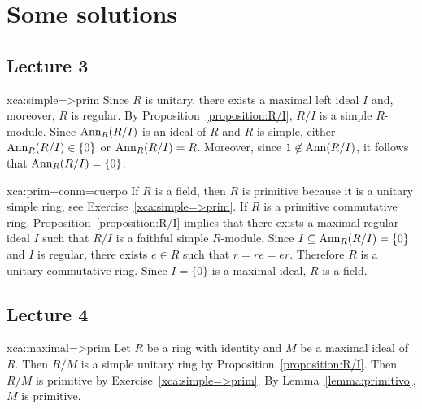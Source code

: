 \chapter*{Some solutions}

\section*{Lecture 3}

\begin{sol}{xca:simple=>prim}
	Since $R$ is unitary, there exists a maximal left ideal $I$ and, moreover, $R$ is regular.
	By Proposition~\ref{proposition:R/I}, $R/I$ is a simple $R$-module. 
	Since $\operatorname{Ann}_R(R/I)$ is an ideal of $R$ and $R$ is simple, either $\operatorname{Ann}_R(R/I)\in\{0\}$ or 
	$\operatorname{Ann}_R(R/I)=R$. Moreover, since 
	$1\not\in\operatorname{Ann}(R/I)$, it follows that 
	$\operatorname{Ann}_R(R/I)=\{0\}$. 
\end{sol}

\begin{sol}{xca:prim+conm=cuerpo}
	If $R$ is a field, then $R$ is primitive because it is a unitary simple ring, see  
	Exercise~\ref{xca:simple=>prim}. If $R$ is a primitive commutative ring, Proposition~\ref{proposition:R/I} implies that there exists a maximal regular ideal $I$
	such that  
	$R/I$ is a faithful simple $R$-module. 
	Since $I\subseteq \operatorname{Ann}_R(R/I)=\{0\}$ and $I$ is regular, there exists $e\in R$ such that 
	$r=re=er$. Therefore $R$ is a unitary commutative ring. Since $I=\{0\}$ is a maximal ideal, 
	$R$ is a field. 
\end{sol}

\section*{Lecture 4}

\begin{sol}{xca:maximal=>prim}
	Let $R$ be a ring with identity and $M$ be a maximal ideal of $R$. Then 
	$R/M$ is a simple unitary ring by 
	Proposition~\ref{proposition:R/I}. Then $R/M$ is primitive by
	Exercise~\ref{xca:simple=>prim}. By Lemma~\ref{lemma:primitivo}, 
	$M$ is primitive. 
\end{sol}

